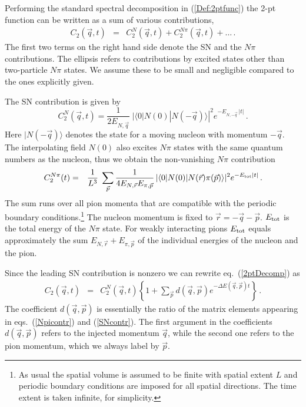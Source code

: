 \documentclass[11pt,prd,aps,showpacs,eqsecnum,floatfix,nofootinbib,preprint,tightenlines]{revtex4}
\newcommand{\pref}[1]{(\ref{#1})}
\newcommand{\np}{N\pi}
\begin{document}
Performing the standard spectral decomposition in \pref{Def:2ptfunc} the 2-pt function can be written as a sum of various contributions,
\begin{eqnarray}\label{2ptDecomp}
C_2(\vec{q},t) & = & C^N_2(\vec{q},t) + C^{\np}_2(\vec{q},t)+\ldots\,.
\end{eqnarray}
The first two terms on the right hand side denote the SN and the $N\pi$ contributions. The ellipsis refers to contributions by excited states other than two-particle $N\pi$ states. We assume these to be small  and negligible compared to the ones explicitly given. 

The SN contribution is given by
\begin{equation}\label{SNcontr}
C^N_2(\vec{q},t)=\frac{1}{2E_{N,\vec{q}}}\;|\langle 0|N(0)|N(-\vec{q})\rangle|^2 e^{-E_{N,-\vec{q}}\, | t |} \,.
\end{equation}
Here $|N(-\vec{q})\rangle$ denotes the state for a moving nucleon with momentum $-\vec{q}$. The interpolating field $N(0)$ also excites $N\pi$  states with the same quantum numbers as the nucleon, thus we obtain the non-vanishing $N\pi$ contribution 
\begin{eqnarray}\label{Npicontr}
C^{\np}_2(t)&=&\frac{1}{L^3}\;\sum_{\vec{p}}\frac{1}{4E_{N,\vec{r}} E_{\pi,\vec{p}}}\,
|\langle 0|N(0)|N(\vec{r}) \pi(\vec{p})\rangle|^2 e^{-E_{\rm tot}|t|}\,.
\end{eqnarray}
The sum runs over all pion momenta that are compatible with the periodic boundary conditions.\footnote{
As usual the spatial volume is assumed to be finite with spatial extent $L$ and periodic boundary conditions are imposed for all spatial directions. The time extent is taken infinite, for simplicity.} The nucleon momentum is fixed to $\vec{r}=-\vec{q}-\vec{p}$. $E_{\rm tot}$ is the total energy of the $N\pi$ state. For weakly interacting pions $E_{\rm tot}$ equals approximately the sum $E_{N,\vec{r}}+ E_{\pi,\vec{p}}$ of the individual energies of the nucleon and the pion. 

Since the leading SN contribution is nonzero we can rewrite eq.\ \pref{2ptDecomp} as
\begin{eqnarray}
C_2(\vec{q},t) & =& C^N_2(\vec{q},t)\left\{1+ \sum_{\vec{p}} d(\vec{q},\vec{p})e^{-\Delta E(\vec{q},\vec{p}) t}\right\}\,.\label{DefC2Npcontr}
\end{eqnarray}
The coefficient $d(\vec{q},\vec{p})$ is essentially the ratio of the matrix elements appearing in eqs.\ \pref{Npicontr} and \pref{SNcontr}. The first argument in the coefficients $d(\vec{q},\vec{p})$ refers to the injected momentum $\vec{q}$, while the second one refers to the pion momentum, which we always label by $\vec{p}$. 
\end{document}

